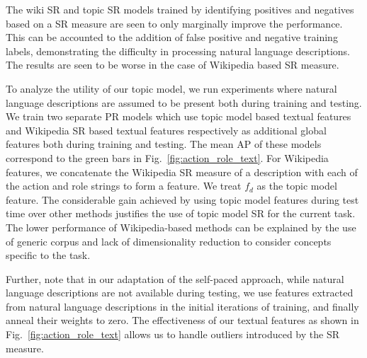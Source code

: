 \documentclass[10pt,twocolumn,letterpaper]{article}
\begin{document}
The wiki SR and topic SR models trained by identifying positives and negatives based on a SR measure are seen to only marginally improve the performance. This can be accounted to the addition of false positive and negative training labels, demonstrating the difficulty in processing natural language descriptions. The results are seen to be worse in the case of Wikipedia based SR measure. %

To analyze the utility of our topic model, we run experiments 
where natural language descriptions are assumed to be present both
during training and testing. We train two separate PR models which use topic
model based textual features and Wikipedia SR based textual features
respectively as additional global features both during training and testing.
The mean AP of these models correspond to the green bars in
Fig.~\ref{fig:action_role_text}. For Wikipedia features, we concatenate the
Wikipedia SR measure of a description with each of the action and role strings
to form a feature. We treat $f_d$ as the topic model feature. The
considerable gain achieved by using topic model features during test time over
other methods justifies the use of topic model SR for the current task. The
lower performance of Wikipedia-based methods can be explained by the use of
generic corpus and lack of dimensionality reduction to consider concepts
specific to the task.

Further, note that in our adaptation of the self-paced approach, 
while natural language descriptions are not available during testing, 
we use features extracted from natural language descriptions in the initial iterations of training, 
and finally anneal their weights to zero. The effectiveness of our textual features as shown in Fig.~\ref{fig:action_role_text} allows us to 
handle outliers introduced by the SR measure.
\end{document}
